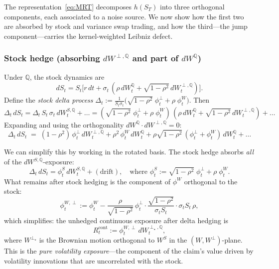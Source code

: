 \documentclass[11pt,a4paper]{article}
\theoremstyle{plain}
\theoremstyle{definition}
\theoremstyle{remark}
\newcommand{\QQ}{\mathbb{Q}}
\begin{document}
The representation~\eqref{eq:MRT} decomposes $h(S_T)$ into three
orthogonal components, each associated to a noise source.  We now
show how the first two are absorbed by stock and variance swap
trading, and how the third---the jump component---carries the
kernel-weighted Leibniz defect.

\subsubsection{Stock hedge (absorbing $dW^{\perp,\QQ}$ and
part of $dW^\QQ$)}

Under $\QQ$, the stock dynamics are
\begin{equation}\label{eq:SQ}
  dS_t = S_t\bigl[r\,dt + \sigma_t\,(\rho\,dW_t^\QQ
  + \sqrt{1-\rho^2}\,dW_t^{\perp,\QQ})\bigr].
\end{equation}
Define the \emph{stock delta process}
$\Delta_t := \frac{1}{S_t\sigma_t}
\bigl(\sqrt{1-\rho^2}\;\phi_t^\perp + \rho\;\phi_t^W\bigr)$.
Then
\begin{equation}\label{eq:stock-hedge-absorption}
  \Delta_t\,dS_t = \Delta_t\,S_t\,\sigma_t\,dW_t^{S,\QQ} + \ldots
  = (\sqrt{1-\rho^2}\;\phi_t^\perp + \rho\;\phi_t^W)\,
  (\rho\,dW_t^\QQ + \sqrt{1-\rho^2}\,dW_t^{\perp,\QQ})
  + \ldots
\end{equation}
Expanding and using the orthogonality $dW^\QQ \cdot dW^{\perp,\QQ} = 0$:
\begin{equation}\label{eq:stock-absorbs}
  \Delta_t\,dS_t \;=\;
  (1-\rho^2)\,\phi_t^\perp\,dW_t^{\perp,\QQ}
  + \rho^2\,\phi_t^W\,dW_t^\QQ
  + \rho\sqrt{1-\rho^2}\,
  (\phi_t^\perp + \phi_t^W)\,dW_t^\QQ
  + \ldots
\end{equation}

We can simplify this by working in the rotated basis.  The stock
hedge absorbs \emph{all} of the $dW^{S,\QQ}$-exposure:
\begin{equation}\label{eq:stock-full}
  \Delta_t\,dS_t = \phi_t^S\,dW_t^{S,\QQ} + (\text{drift}),
  \quad \text{where }
  \phi_t^S := \sqrt{1-\rho^2}\;\phi_t^\perp + \rho\;\phi_t^W.
\end{equation}
What remains after stock hedging is the component of $\phi^W$
orthogonal to the stock:
\begin{equation}\label{eq:residual-after-stock}
  \phi_t^{W,\perp} := \phi_t^W
  - \frac{\rho}{\sqrt{1-\rho^2}}\,\phi_t^\perp
  \cdot \frac{\sqrt{1-\rho^2}}{\sigma_t S_t}
  \cdot \sigma_t S_t\,\rho,
\end{equation}
which simplifies: the unhedged continuous exposure after delta
hedging is
\begin{equation}\label{eq:after-delta}
  R_t^{\mathrm{cont}} := \phi_t^{W,\perp}\,dW_t^{\perp_\star,\QQ},
\end{equation}
where $W^{\perp_\star}$ is the Brownian motion orthogonal to
$W^S$ in the $(W,W^\perp)$-plane.  This is the \emph{pure
volatility exposure}---the component of the claim's value
driven by volatility innovations that are uncorrelated with
the stock.
\end{document}
